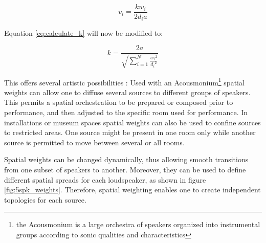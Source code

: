 \documentclass[twoside,10pt]{article}
\begin{document}
\begin{equation} \label{eq:inverse_distance_weighed}
v_{i} = \frac{k w_{i}}{2 d_{i} a} 
\end{equation}

Equation \ref{eq:calculate_k} will now be modified to:

\begin{equation} \label{eq:calculate_k_weighted}
k = \frac{2a}{\sqrt{\sum_{i=1}^{N} \frac{{w_{i}}^2}{{d_{i}}^2}}}
\end{equation}

This offers several artistic possibilities : Used with an Acousmonium\footnote{the Acousmonium is a large orchestra of speakers organized into instrumental groups according to sonic qualities and characteristics} \cite{Bayle:1993MusiqueAcousmatique} spatial weights can allow one to diffuse several sources to different groups of speakers. This permits a spatial orchestration to be prepared or composed prior to performance, and then adjusted to the specific room used for performance.  In installations or museum spaces spatial weights can also be used to confine sources to restricted areas. One source might be present in one room only while another source is permitted to move between several or all rooms.

Spatial weights can be changed dynamically, thus allowing smooth transitions from one subset of speakers to another. Moreover, they can be used to define different spatial spreads for each loudspeaker, as shown in figure \ref{fig:5spk_weights}. Therefore, spatial weighting enables one to create independent topologies for each source.





%
%
\end{document}
